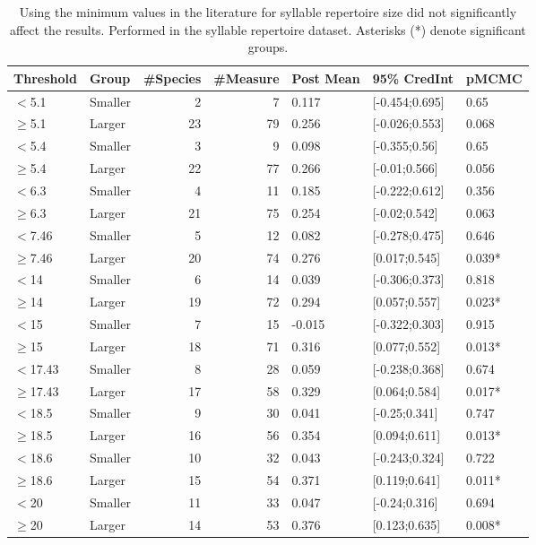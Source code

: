 \documentclass{article}
\begin{document}
  \begin{table}[H]
  \centering
  \caption{Using the minimum values in the literature for syllable repertoire size did not significantly affect the results. Performed in the syllable repertoire dataset. Asterisks (*) denote significant groups.} 
  \begin{tabular}{llrrlll}
  \hline
  Threshold & Group & \#Species & \#Measure & Post Mean & 95\% CredInt & pMCMC \\ 
  \hline
  $<$5.1 & Smaller & 2 & 7 & 0.117 & [-0.454;0.695] & 0.65 \\ 
  $\ge$5.1 & Larger & 23 & 79 & 0.256 & [-0.026;0.553] & 0.068 \\ 
  $<$5.4 & Smaller & 3 & 9 & 0.098 & [-0.355;0.56] & 0.65 \\ 
  $\ge$5.4 & Larger & 22 & 77 & 0.266 & [-0.01;0.566] & 0.056 \\ 
  $<$6.3 & Smaller & 4 & 11 & 0.185 & [-0.222;0.612] & 0.356 \\ 
  $\ge$6.3 & Larger & 21 & 75 & 0.254 & [-0.02;0.542] & 0.063 \\ 
  $<$7.46 & Smaller & 5 & 12 & 0.082 & [-0.278;0.475] & 0.646 \\ 
  $\ge$7.46 & Larger & 20 & 74 & 0.276 & [0.017;0.545] & 0.039* \\ 
  $<$14 & Smaller & 6 & 14 & 0.039 & [-0.306;0.373] & 0.818 \\ 
  $\ge$14 & Larger & 19 & 72 & 0.294 & [0.057;0.557] & 0.023* \\ 
  $<$15 & Smaller & 7 & 15 & -0.015 & [-0.322;0.303] & 0.915 \\ 
  $\ge$15 & Larger & 18 & 71 & 0.316 & [0.077;0.552] & 0.013* \\ 
  $<$17.43 & Smaller & 8 & 28 & 0.059 & [-0.238;0.368] & 0.674 \\ 
  $\ge$17.43 & Larger & 17 & 58 & 0.329 & [0.064;0.584] & 0.017* \\ 
  $<$18.5 & Smaller & 9 & 30 & 0.041 & [-0.25;0.341] & 0.747 \\ 
  $\ge$18.5 & Larger & 16 & 56 & 0.354 & [0.094;0.611] & 0.013* \\ 
  $<$18.6 & Smaller & 10 & 32 & 0.043 & [-0.243;0.324] & 0.722 \\ 
  $\ge$18.6 & Larger & 15 & 54 & 0.371 & [0.119;0.641] & 0.011* \\ 
  $<$20 & Smaller & 11 & 33 & 0.047 & [-0.24;0.316] & 0.694 \\ 
  $\ge$20 & Larger & 14 & 53 & 0.376 & [0.123;0.635] & 0.008* \\ 

\end{tabular}
\end{table}
\end{document}
